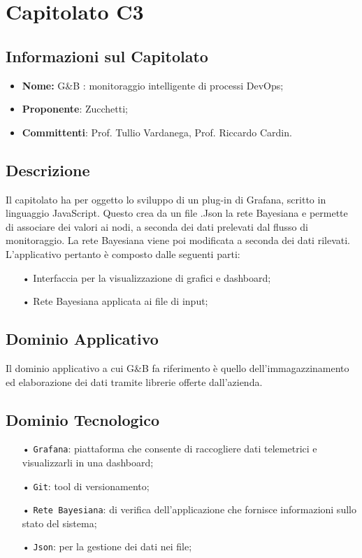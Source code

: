 \section{Capitolato C3}

\subsection{Informazioni sul Capitolato}

\begin{itemize}
	\item \textbf{Nome:} G\&{B} : monitoraggio intelligente di processi DevOps;
	\item \textbf{Proponente}: Zucchetti;
	\item \textbf{Committenti}: Prof. Tullio Vardanega, Prof. Riccardo Cardin.
\end{itemize}

\subsection{Descrizione}
Il capitolato ha per oggetto lo sviluppo di un plug-in di Grafana, scritto in linguaggio JavaScript. Questo crea da un file .Json la rete Bayesiana e permette di associare dei valori ai nodi, a seconda dei dati prelevati dal flusso di monitoraggio.
La rete Bayesiana viene poi modificata a seconda dei dati rilevati. 
L'applicativo pertanto è composto dalle seguenti parti: 

\begin{itemize}

\item[•] Interfaccia per la visualizzazione di grafici e dashboard;
\item[•] Rete Bayesiana applicata ai file di input;

\end{itemize}

\subsection{Dominio Applicativo}
Il dominio applicativo a cui G\&{B} fa riferimento è quello dell'immagazzinamento ed elaborazione dei dati tramite librerie offerte dall'azienda. 

\subsection{Dominio Tecnologico}
\begin{itemize}

\item[•] \texttt{Grafana}: piattaforma che consente di raccogliere dati telemetrici e visualizzarli in una dashboard;
\item[•] \texttt{Git}: tool di versionamento;
\item[•] \texttt{Rete Bayesiana}: di verifica dell'applicazione che fornisce informazioni sullo stato del sistema;
\item[•] \texttt{Json}: per la gestione dei dati nei file;

\end{itemize}

